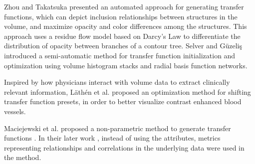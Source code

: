 \documentclass{egpubl}
\begin{document}
Zhou and Takatsuka \cite{zhou_automatic_2009} presented an automated approach for generating transfer functions, which can depict inclusion relationships between structures in the volume, and maximize opacity and color differences among the structures. This approach uses a residue flow model based on Darcy's Law to differentiate the distribution of opacity between branches of a contour tree.
Selver and G{\"u}zeli{\c s} \cite{alper_selver_semiautomatic_2009} introduced a semi-automatic method for transfer function initialization and optimization using volume histogram stacks and radial basis function networks.

Inspired by how physicians interact with volume data to extract clinically relevant information, L{\"a}th{\'e}n et al. \cite{lathen_automatic_2012} proposed an optimization method for shifting transfer function presets, in order to better visualize contrast enhanced blood vessels.


Maciejewski et al. proposed a non-parametric method to generate transfer functions \cite{maciejewski_structuring_2009}.
In their later work \cite{maciejewski_abstracting_2013}, instead of using the attributes, metrics representing relationships and correlations in the underlying data were used in the method.



\end{document}

